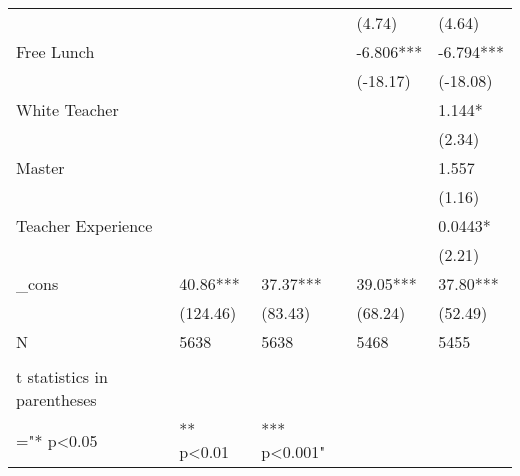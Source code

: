 \documentclass{article}
\begin{document}
\begin{table}[htbp]
\begin{tabular}{lrllrr}
          &       &       &       & \multicolumn{1}{l}{(4.74)} & \multicolumn{1}{l}{(4.64)} \\
    \multicolumn{2}{l}{Free Lunch} &       &       & \multicolumn{1}{l}{-6.806***} & \multicolumn{1}{l}{-6.794***} \\
          &       &       &       & \multicolumn{1}{l}{(-18.17)} & \multicolumn{1}{l}{(-18.08)} \\
    \multicolumn{2}{l}{White Teacher} &       &       & \multicolumn{1}{l}{} & \multicolumn{1}{l}{1.144*} \\
          &       &       &       & \multicolumn{1}{l}{} & \multicolumn{1}{l}{(2.34)} \\
    \multicolumn{2}{l}{Master} &       &       & \multicolumn{1}{l}{} & \multicolumn{1}{l}{1.557} \\
          &       &       &       & \multicolumn{1}{l}{} & \multicolumn{1}{l}{(1.16)} \\
    \multicolumn{2}{l}{Teacher Experience} &       &       & \multicolumn{1}{l}{} & \multicolumn{1}{l}{0.0443*} \\
          &       &       &       & \multicolumn{1}{l}{} & \multicolumn{1}{l}{(2.21)} \\
    \multicolumn{2}{l}{\_cons} & 40.86*** & 37.37*** & \multicolumn{1}{l}{39.05***} & \multicolumn{1}{l}{37.80***} \\
          &       & (124.46) & (83.43) & \multicolumn{1}{l}{(68.24)} & \multicolumn{1}{l}{(52.49)} \\
    \multicolumn{2}{l}{N} & 5638  & 5638  & \multicolumn{1}{l}{5468} & \multicolumn{1}{l}{5455} \\
    \midrule
          &       &       &       &       &  \\
    t statistics in parentheses &       &       &       &       &  \\
    ="* p<0.05 &       &  ** p<0.01 &  *** p<0.001" &       &  \\
    \bottomrule
    \bottomrule
    \end{tabular}%
  \label{tab:addlabel}%
\end{table}%


\end{document}
